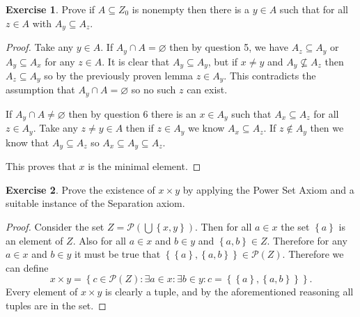 \documentclass{article}
\theoremstyle{definition}
\newtheorem{question}{Exercise}
\newcommand{\set}[1]{\left\{#1\right\}}
\newcommand{\setwith}[2]{\set{#1\colon#2}}
\newcommand{\powset}{\mathcal{P}}
\begin{document}
\begin{question}
    Prove if \(A\subseteq Z_{0}\) is nonempty then there is a \(y\in A\) such
    that for all \(z\in A\) with \(A_{y}\subseteq A_{z}\).

    \begin{proof}
        Take any \(y\in A\). If \(A_{y}\cap A=\varnothing\) then by question 5,
        we have \(A_{z}\subseteq A_{y}\) or \(A_{y}\subseteq A_{x}\) for any
        \(z\in A\). It is clear that \(A_{y}\subseteq A_{y}\), but if \(x\neq
        y\) and \(A_{y}\nsubseteq A_{z}\) then \(A_{z}\subseteq A_{y}\) so by
        the previously proven lemma \(z\in A_{y}\). This contradicts the
        assumption that \(A_{y}\cap A=\varnothing\) so no such \(z\) can exist.

        If \(A_{y}\cap A\neq\varnothing\) then by question \(6\) there is an
        \(x\in A_{y}\) such that \(A_{x}\subseteq A_{z}\) for all \(z\in
        A_{y}\). Take any \(z\neq y\in A\) then if \(z\in A_{y}\) we know
        \(A_{x}\subseteq A_{z}\). If \(z\notin A_{y}\) then we know that
        \(A_{y}\subseteq A_{z}\) so \(A_{x}\subseteq A_{y}\subseteq A_{z}\).

        This proves that \(x\) is the minimal element.
    \end{proof}
\end{question}

\begin{question}
    Prove the existence of \(x\times y\) by applying the Power Set Axiom and a
    suitable instance of the Separation axiom.

    \begin{proof}
        Consider the set \(Z=\powset(\bigcup\set{x,y})\). Then for all \(a\in
        x\) the set \(\set{a}\) is an element of \(Z\). Also for all \(a\in x\)
        and \(b\in y\) and \(\set{a,b}\in Z\). Therefore for any \(a\in x\) and
        \(b\in y\) it must be true that
        \(\set{\set{a},\set{a,b}}\in\powset(Z)\). Therefore we can define
        \[
            x\times y=\setwith{c\in \powset(Z)}{\exists a\in x:\exists b\in y:c=\set{\set{a},\set{a,b}}}.
        \]
        Every element of \(x\times y\) is clearly a tuple, and by the
        aforementioned reasoning all tuples are in the set.
    \end{proof}
\end{question}
\end{document}
